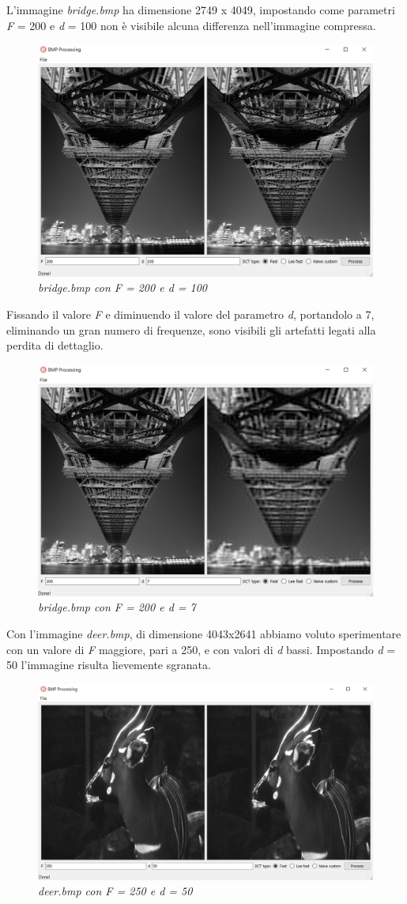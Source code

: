 \documentclass[a4paper,12pt]{report}
\begin{document}
\noindent L'immagine \textit{bridge.bmp} ha dimensione 2749 x 4049, impostando come parametri  \textit{F} = 200 e \textit{d} = 100 non è visibile alcuna differenza nell'immagine compressa.

\begin{figure}[H]
\centering
\includegraphics[width=0.65\linewidth]{../img/bridge_200_100.png}
\caption{\textit{bridge.bmp con F = 200 e d = 100}}
\end{figure}

\noindent Fissando il valore \textit{F} e diminuendo il valore del parametro \textit{d}, portandolo a 7, eliminando un gran numero di frequenze, sono visibili gli artefatti legati alla perdita di dettaglio.

\begin{figure}[H]
\centering
\includegraphics[width=0.65\linewidth]{../img/bridge_200_7.png}
\caption{\textit{bridge.bmp con F = 200 e d = 7}}
\end{figure}

\noindent Con l'immagine \textit{deer.bmp}, di dimensione 4043x2641 abbiamo voluto sperimentare con un valore di \textit{F} maggiore, pari a 250, e con valori di \textit{d} bassi.
Impostando \textit{d} = 50 l'immagine risulta lievemente sgranata.
\bigskip

\begin{figure}[H]
\centering
\includegraphics[width=0.75\linewidth]{../img/bambi_250_50.png}
\caption{\textit{deer.bmp con F = 250 e d = 50}}
\end{figure}
\end{document}
